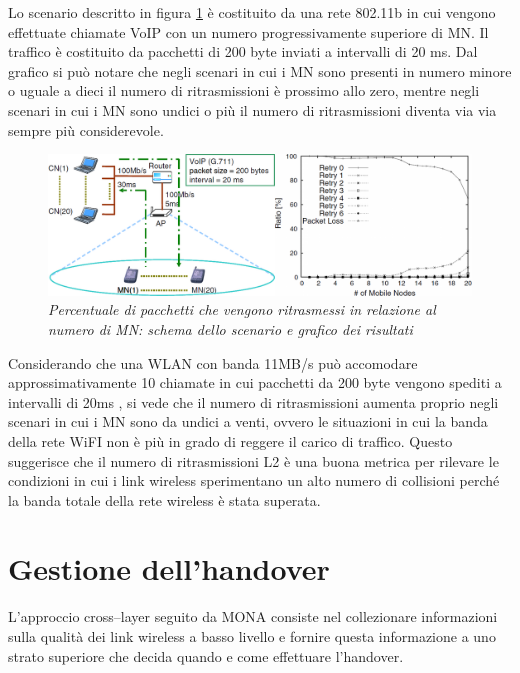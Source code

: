 \documentclass[12pt,a4paper,openright,twoside]{book}
\begin{document}
Lo scenario descritto in figura \ref{fig:mona-collision-simulation} è
costituito da una rete 802.11b in cui vengono effettuate chiamate VoIP
con un numero progressivamente superiore di MN. Il traffico è
costituito da pacchetti di 200 byte inviati a intervalli di 20 ms. Dal
grafico si può notare che negli scenari in cui i MN sono presenti in
numero minore o uguale a dieci il numero di ritrasmissioni è prossimo
allo zero, mentre negli scenari in cui i MN sono undici o più il
numero di ritrasmissioni diventa via via sempre più considerevole.

\begin{figure}
\centering
\includegraphics[width=\textwidth]{img/mona-collision-simulation}
\caption{\em Percentuale di pacchetti che vengono ritrasmessi in relazione
  al numero di MN: schema dello scenario e grafico dei risultati}
\label{fig:mona-collision-simulation}
\end{figure}

Considerando che una WLAN con banda 11MB/s può accomodare
approssimativamente 10 chiamate in cui pacchetti da 200 byte vengono
spediti a intervalli di 20ms \cite{bib:banda-wlan}, si vede che il
numero di ritrasmissioni aumenta proprio negli scenari in cui i MN
sono da undici a venti, ovvero le situazioni in cui la banda della
rete WiFI non è più in grado di reggere il carico di traffico. Questo
suggerisce che il numero di ritrasmissioni L2 è una buona metrica per
rilevare le condizioni in cui i link wireless sperimentano un alto
numero di collisioni perché la banda totale della rete wireless è
stata superata.

\section{Gestione dell'handover}

L'approccio cross--layer seguito da MONA consiste nel collezionare
informazioni sulla qualità dei link wireless a basso livello e fornire
questa informazione a uno strato superiore che decida quando e come
effettuare l'handover.
\end{document}
